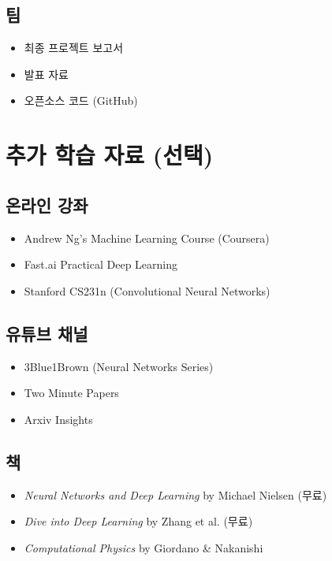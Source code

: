 \documentclass[11pt,a4paper]{article}
\begin{document}
\subsection{팀}
\begin{itemize}[noitemsep]
    \item 최종 프로젝트 보고서
    \item 발표 자료
    \item 오픈소스 코드 (GitHub)
\end{itemize}

\section{추가 학습 자료 (선택)}

\subsection{온라인 강좌}
\begin{itemize}[noitemsep]
    \item Andrew Ng's Machine Learning Course (Coursera)
    \item Fast.ai Practical Deep Learning
    \item Stanford CS231n (Convolutional Neural Networks)
\end{itemize}

\subsection{유튜브 채널}
\begin{itemize}[noitemsep]
    \item 3Blue1Brown (Neural Networks Series)
    \item Two Minute Papers
    \item Arxiv Insights
\end{itemize}

\subsection{책}
\begin{itemize}[noitemsep]
    \item \textit{Neural Networks and Deep Learning} by Michael Nielsen (무료)
    \item \textit{Dive into Deep Learning} by Zhang et al. (무료)
    \item \textit{Computational Physics} by Giordano \& Nakanishi
\end{itemize}
\end{document}
